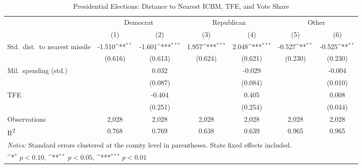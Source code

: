 \begin{table}[htbp]\centering
\setlength{\tabcolsep}{5pt}
\small
\def\sym#1{\ifmmode^{#1}\else\(^{#1}\)\fi}
\caption{Presidential Elections: Distance to Nearest ICBM, TFE, and Vote Share}
\begin{tabular}{l*{6}{c}}
\toprule
                    &\multicolumn{2}{c}{Democrat}&\multicolumn{2}{c}{Republican}&\multicolumn{2}{c}{Other}\\
\cmidrule(lr){2-3}\cmidrule(lr){4-5}\cmidrule(lr){6-7}
                    &\multicolumn{1}{c}{(1)}&\multicolumn{1}{c}{(2)}&\multicolumn{1}{c}{(3)}&\multicolumn{1}{c}{(4)}&\multicolumn{1}{c}{(5)}&\multicolumn{1}{c}{(6)}\\
\midrule
Std.\ dist.\ to nearest missile
                    &      -1.510\sym{**} &      -1.601\sym{***}&       1.957\sym{***}&       2.048\sym{***}&      -0.527\sym{**} &      -0.525\sym{**} \\
                    &     (0.616)         &     (0.613)         &     (0.624)         &     (0.621)         &     (0.230)         &     (0.230)         \\
Mil.\ spending (std.)
                    &                     &       0.032         &                     &      -0.029         &                     &      -0.004         \\
                    &                     &     (0.087)         &                     &     (0.084)         &                     &     (0.010)         \\
TFE                 &                     &      -0.404         &                     &       0.405         &                     &       0.008         \\
                    &                     &     (0.251)         &                     &     (0.254)         &                     &     (0.044)         \\
\midrule
Observations        &       2,028         &       2,028         &       2,028         &       2,028         &       2,028         &       2,028         \\
R\textsuperscript{2}&       0.768         &       0.769         &       0.638         &       0.639         &       0.965         &       0.965         \\
\bottomrule
\multicolumn{7}{l}{\footnotesize \textit{Notes:} Standard errors clustered at the county level in parentheses. State fixed effects included.}\\
\multicolumn{7}{l}{\footnotesize \sym{*} \(p<0.10\), \sym{**} \(p<0.05\), \sym{***} \(p<0.01\)}\\
\end{tabular}
\end{table}
